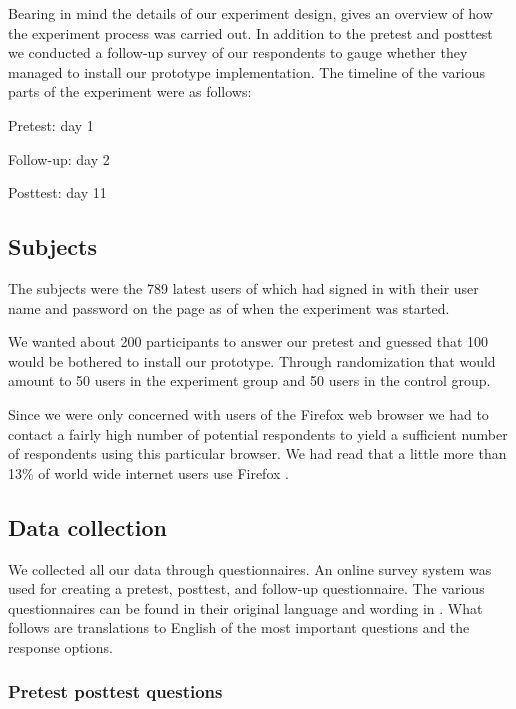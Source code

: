 Bearing in mind the details of our experiment design,
 gives an overview of how the experiment
process was carried out. In addition to the pretest and posttest we
conducted a follow-up survey of our respondents to gauge whether they managed
to install our prototype implementation. The timeline of the various parts
of the experiment were as follows:

\begin{enum}
  \item Pretest: day 1
  \item Follow-up: day 2
  \item Posttest: day 11
\end{enum}

\subsection{Subjects}
\label{section:empirical.methodology.subjects}

The subjects were the 789 latest users of \urort{} which had
signed in with their user name and password on the \urort{} page as of when
the experiment was started.

We wanted about 200 participants to answer our pretest and guessed that
100 would be bothered to install our prototype. Through randomization
that would amount to 50 users in the experiment group and 50 users
in the control group.

Since we were only concerned with users of the Firefox web browser we had to
contact a fairly high number of potential respondents to yield a sufficient
number of respondents using this particular browser. We had read that a little
more than 13\% of world wide internet users use Firefox \citep{onestat08}.

\subsection{Data collection}

\removeline

We collected all our data through questionnaires. An online survey system was
used for creating a pretest, posttest, and follow-up questionnaire.
The various
questionnaires can be found in their original language and wording in
. What follows are translations to English
of the most important questions and the response options.

\subsubsection{Pretest \oldand posttest questions}

